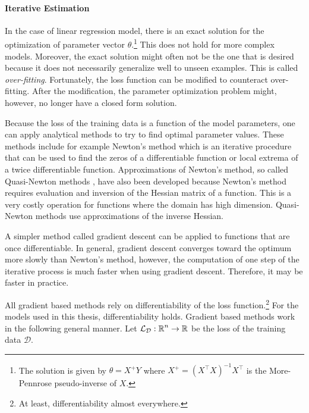 
\paragraph{Iterative Estimation} In the case of linear regression
model, there is an exact solution for the optimization of parameter
vector $\theta$.\footnote{The solution is given by $\theta = X^+Y$
  where $X^+ = (X^\top X)^{-1}X^\top$ is the More-Pennrose
  pseudo-inverse of $X$.} This does not hold for more complex
models. Moreover, the exact solution might often not be the one that
is desired because it does not necessarily generalize well to unseen
examples. This is called {\it over-fitting}. Fortunately, the loss
function can be modified to counteract over-fitting. After the
modification, the parameter optimization problem might, however, no
longer have a closed form solution.

Because the loss of the training data is a function of the model
parameters, one can apply analytical methods to try to find optimal
parameter values. These methods include for example Newton's method
which is an iterative procedure that can be used to find the zeros of
a differentiable function or local extrema of a twice differentiable
function. Approximations of Newton's method, so called Quasi-Newton
methods \citep{Liu1989}, have also been developed because Newton's
method requires evaluation and inversion of the Hessian matrix of a
function. This is a very costly operation for functions where the
domain has high dimension. Quasi-Newton methods use approximations of
the inverse Hessian.

A simpler method called gradient descent can be applied to functions
that are once differentiable. In
general, gradient descent converges toward the optimum more slowly
than Newton's method, however, the computation of one step of the
iterative process is much faster when using gradient
descent. Therefore, it may be faster in practice.

All gradient based methods rely on differentiability of the loss
function.\footnote{At least, differentiability almost everywhere.} For
the models used in this thesis, differentiability holds. Gradient
based methods work in the following general manner. Let
$\mathcal{L}_{\mathcal{D}}:\mbox{$\mathbb R$}^n \rightarrow \mbox{$\mathbb R$}$ be the loss of the training data
$\mathcal{D}$.

